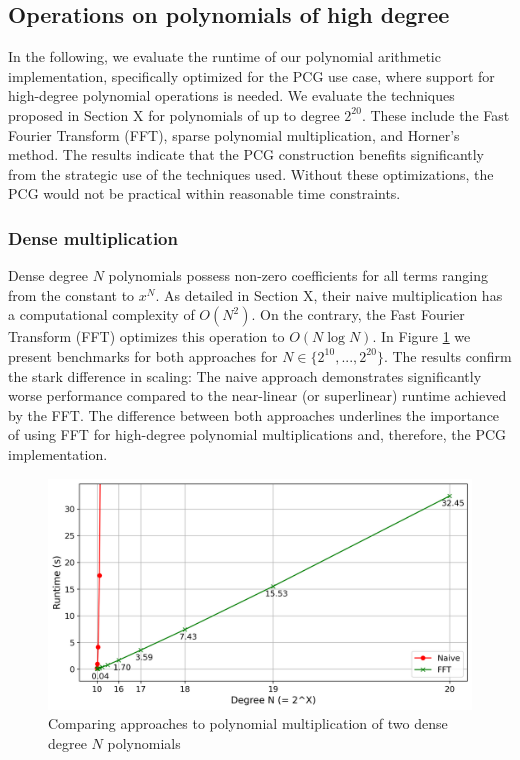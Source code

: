 \subsection{Operations on polynomials of high degree}
In the following, we evaluate the runtime of our polynomial arithmetic implementation, specifically optimized for the PCG use case, where support for high-degree polynomial operations is needed. We evaluate the techniques proposed in Section X for polynomials of up to degree $2^{20}$. These include the Fast Fourier Transform (FFT), sparse polynomial multiplication, and Horner's method. The results indicate that the PCG construction benefits significantly from the strategic use of the techniques used. Without these optimizations, the PCG would not be practical within reasonable time constraints.

\subsubsection{Dense multiplication}
Dense degree $N$ polynomials possess non-zero coefficients for all terms ranging from the constant to $x^N$. As detailed in Section X, their naive multiplication has a computational complexity of $O(N^2)$. On the contrary, the Fast Fourier Transform (FFT) optimizes this operation to $O(N \log N)$. In Figure \ref{fig:polyMultNaiveVsFFT} we present benchmarks for both approaches for $N\in \{2^{10}, ..., 2^{20}\}$. The results confirm the stark difference in scaling: The naive approach demonstrates significantly worse performance compared to the near-linear (or superlinear) runtime achieved by the FFT. The difference between both approaches underlines the importance of using FFT for high-degree polynomial multiplications and, therefore, the PCG implementation.

\begin{figure}[h!]
    \centering
    \includegraphics[scale=0.49]{images/plots/poly_mult.png}
    \caption{Comparing approaches to polynomial multiplication of two dense degree $N$ polynomials}
    \label{fig:polyMultNaiveVsFFT}
\end{figure}

